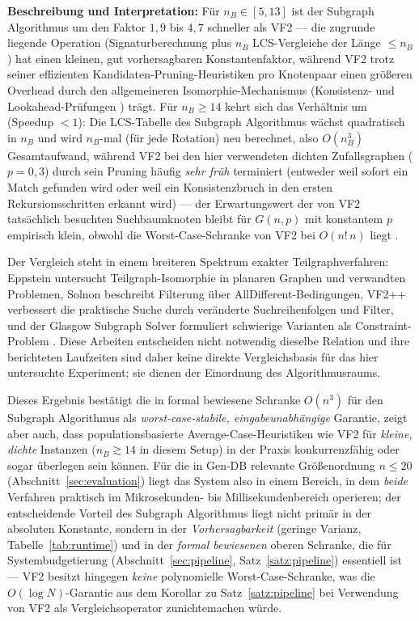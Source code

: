 \documentclass[a4paper,12pt, twoside]{report}
\theoremstyle{definition}
\begin{document}
\textbf{Beschreibung und Interpretation:} Für $n_B\in[5,13]$ ist der Subgraph Algorithmus um den Faktor $1{,}9$ bis $4{,}7$ schneller als VF2 — die zugrunde liegende Operation (Signaturberechnung plus $n_B$ LCS-Vergleiche der Länge $\le n_B$) hat einen kleinen, gut vorhersagbaren Konstantenfaktor, während VF2 trotz seiner effizienten Kandidaten-Pruning-Heuristiken pro Knotenpaar einen größeren Overhead durch den allgemeineren Isomorphie-Mechanismus (Konsistenz- und Look\-ahead-Prüfungen \cite{cordella2004}) trägt. Für $n_B\ge 14$ kehrt sich das Verhältnis um (Speedup $<1$): Die LCS-Tabelle des Subgraph Algorithmus wächst quadratisch in $n_B$ und wird $n_B$-mal (für jede Rotation) neu berechnet, also $O(n_B^3)$ Gesamtaufwand, während VF2 bei den hier verwendeten dichten Zufallsgraphen ($p=0{,}3$) durch sein Pruning häufig \emph{sehr früh} terminiert (entweder weil sofort ein Match gefunden wird oder weil ein Konsistenzbruch in den ersten Rekursionsschritten erkannt wird) — der Erwartungswert der von VF2 tatsächlich besuchten Suchbaumknoten bleibt für $G(n,p)$ mit konstantem $p$ empirisch klein, obwohl die Worst-Case-Schranke von VF2 bei $O(n!\,n)$ liegt \cite{cordella2004}.

Der Vergleich steht in einem breiteren Spektrum exakter Teilgraphverfahren: Eppstein untersucht Teilgraph-Isomorphie in planaren Graphen und verwandten Problemen, Solnon beschreibt Filterung über AllDifferent-Bedingungen, VF2++ verbessert die praktische Suche durch veränderte Suchreihenfolgen und Filter, und der Glasgow Subgraph Solver formuliert schwierige Varianten als Constraint-Problem \cite{eppstein1999planar,solnon2010alldifferent,juttner2018vf2pp,mccreesh2020glasgow}. Diese Arbeiten entscheiden nicht notwendig dieselbe Relation und ihre berichteten Laufzeiten sind daher keine direkte Vergleichsbasis für das hier untersuchte Experiment; sie dienen der Einordnung des Algorithmusraums.

Dieses Ergebnis bestätigt die in \cite{epp2026subgraph} formal bewiesene Schranke $O(n^3)$ für den Subgraph Algorithmus als \emph{worst-case-stabile, eingabeunabhängige} Garantie, zeigt aber auch, dass populationsbasierte Average-Case-Heuristiken wie VF2 für \emph{kleine, dichte} Instanzen ($n_B\gtrsim 14$ in diesem Setup) in der Praxis konkurrenzfähig oder sogar überlegen sein können. Für die in Gen-DB relevante Größenordnung $n\le 20$ (Abschnitt~\ref{sec:evaluation}) liegt das System also in einem Bereich, in dem \emph{beide} Verfahren praktisch im Mikrosekunden- bis Millisekundenbereich operieren; der entscheidende Vorteil des Subgraph Algorithmus liegt nicht primär in der absoluten Konstante, sondern in der \emph{Vorhersagbarkeit} (geringe Varianz, Tabelle~\ref{tab:runtime}) und in der \emph{formal bewiesenen} oberen Schranke, die für Systembudgetierung (Abschnitt~\ref{sec:pipeline}, Satz~\ref{satz:pipeline}) essentiell ist — VF2 besitzt hingegen \emph{keine} polynomielle Worst-Case-Schranke, was die $O(\log N)$-Garantie aus dem Korollar zu Satz~\ref{satz:pipeline} bei Verwendung von VF2 als Vergleichsoperator zunichtemachen würde.
\end{document}
